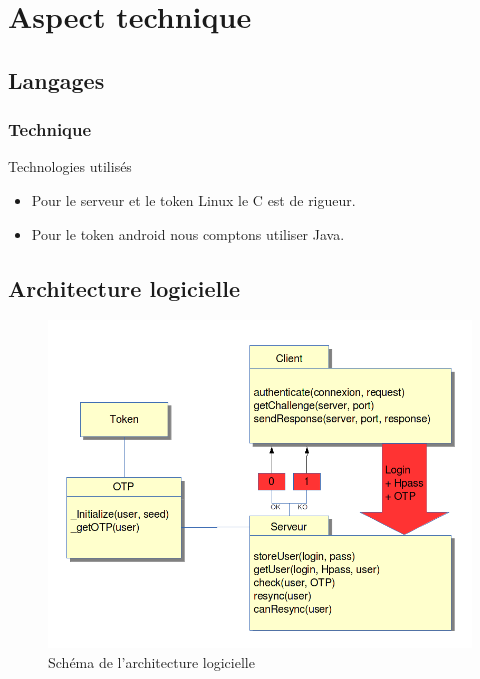 \documentclass{beamer}
\begin{document}
\section{Aspect technique}

\subsection{Langages}
\begin{frame}
\frametitle{Technique}
\begin{block}{Technologies utilisés}
\begin{itemize}
  \item Pour le serveur et le token Linux le C est de rigueur.
  \item Pour le token android nous comptons utiliser Java. 
\end{itemize}
\end{block}
\end{frame}

\subsection{Architecture logicielle}
\begin{frame}
\begin{figure}
 \includegraphics[scale=0.1]{img/architecture.png} %
 \caption{Schéma de l'architecture logicielle}
\end{figure}

\end{frame}
\end{document}
